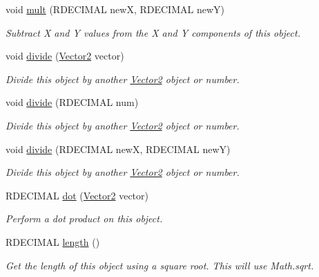 \begin{DoxyCompactItemize}
void \hyperlink{class_rad_j_a_v_1_1_vector2_a78cf22468d8439e648986a0a24cdf8e0}{mult} (R\+D\+E\+C\+I\+M\+AL newX, R\+D\+E\+C\+I\+M\+AL newY)
\begin{DoxyCompactList}\small\item\em Subtract X and Y values from the X and Y components of this object. \end{DoxyCompactList}\item 
void \hyperlink{class_rad_j_a_v_1_1_vector2_a55fbc1afa95bb47dfd196345ad8769e1}{divide} (\hyperlink{class_rad_j_a_v_1_1_vector2}{Vector2} vector)
\begin{DoxyCompactList}\small\item\em Divide this object by another \hyperlink{class_rad_j_a_v_1_1_vector2}{Vector2} object or number. \end{DoxyCompactList}\item 
void \hyperlink{class_rad_j_a_v_1_1_vector2_a77e41c583b4ebd992667e73d4461a467}{divide} (R\+D\+E\+C\+I\+M\+AL num)
\begin{DoxyCompactList}\small\item\em Divide this object by another \hyperlink{class_rad_j_a_v_1_1_vector2}{Vector2} object or number. \end{DoxyCompactList}\item 
void \hyperlink{class_rad_j_a_v_1_1_vector2_a3280ad74cae19bf47ebcb566e77d163f}{divide} (R\+D\+E\+C\+I\+M\+AL newX, R\+D\+E\+C\+I\+M\+AL newY)
\begin{DoxyCompactList}\small\item\em Divide this object by another \hyperlink{class_rad_j_a_v_1_1_vector2}{Vector2} object or number. \end{DoxyCompactList}\item 
R\+D\+E\+C\+I\+M\+AL \hyperlink{class_rad_j_a_v_1_1_vector2_a494ea0583bcb5173767d11a87fd1e505}{dot} (\hyperlink{class_rad_j_a_v_1_1_vector2}{Vector2} vector)
\begin{DoxyCompactList}\small\item\em Perform a dot product on this object. \end{DoxyCompactList}\item 
R\+D\+E\+C\+I\+M\+AL \hyperlink{class_rad_j_a_v_1_1_vector2_a5bf17d1538599fdbddd9d3b899fae7b5}{length} ()
\begin{DoxyCompactList}\small\item\em Get the length of this object using a square root. This will use Math.\+sqrt. \end{DoxyCompactList}\item 

\end{DoxyCompactItemize}
